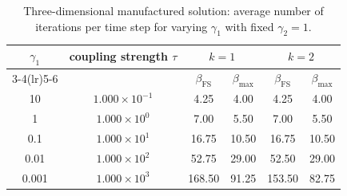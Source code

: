 \begin{table}[ht!]
\centering
\renewcommand{\arraystretch}{1.15}
\begin{tabular}{cccccc}
\toprule
$\gamma_1$ & coupling strength $\tau$ & \multicolumn{2}{c}{$k=1$} & \multicolumn{2}{c}{$k=2$} \\
\cmidrule(lr){3-4}\cmidrule(lr){5-6}
 &  & $\beta_{\mathrm{FS}}$ & $\beta_{\max}$ & $\beta_{\mathrm{FS}}$ & $\beta_{\max}$ \\
\midrule
10 & $1.000 \times 10^{-1}$ & 4.25 & 4.00 & 4.25 & 4.00 \\
1 & $1.000 \times 10^{0}$ & 7.00 & 5.50 & 7.00 & 5.50 \\
0.1 & $1.000 \times 10^{1}$ & 16.75 & 10.50 & 16.75 & 10.50 \\
0.01 & $1.000 \times 10^{2}$ & 52.75 & 29.00 & 52.50 & 29.00 \\
0.001 & $1.000 \times 10^{3}$ & 168.50 & 91.25 & 153.50 & 82.75 \\
\bottomrule
\end{tabular}
\caption{Three-dimensional manufactured solution: average number of iterations per time step for varying $\gamma_1$ with fixed $\gamma_2 = 1$.}
\label{tab:manufactured_gamma_scan_3d}
\end{table}
